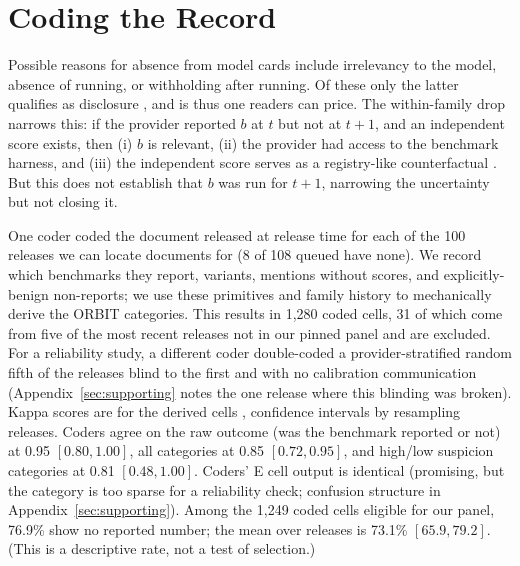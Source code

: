 \documentclass{article}
\begin{document}
\section{Coding the Record}\label{sec:reach}

Possible reasons for absence from model cards include irrelevancy to the model, absence of running, or withholding after running. Of these only the latter qualifies as disclosure \citep{grossman1981,milgrom1981,dye1985}, and is thus one readers can price. The within-family drop narrows this: if the provider reported $b$ at $t$ but not at $t + 1$, and an independent score exists, then (i) $b$ is relevant, (ii) the provider had access to the benchmark harness, and (iii) the independent score serves as a registry-like counterfactual \citep{chan2004,dwan2013,kirkham2010}. But this does not establish that $b$ was run for $t + 1$, narrowing the \citet{dye1985} uncertainty but not closing it.

One coder coded the document released at release time for each of the 100 releases we can locate documents for (8 of 108 queued have none). We record which benchmarks they report, variants, mentions without scores, and explicitly-benign non-reports; we use these primitives and family history to mechanically derive the ORBIT categories. This results in 1,280 coded cells, 31 of which come from five of the most recent releases not in our pinned panel and are excluded. For a reliability study, a different coder double-coded a provider-stratified random fifth of the releases blind to the first and with no calibration communication (Appendix~\ref{sec:supporting} notes the one release where this blinding was broken). Kappa scores are for the derived cells \citep{cohen1960}, confidence intervals by resampling releases. Coders agree on the raw outcome (was the benchmark reported or not) at 0.95 $[0.80, 1.00]$, all categories at 0.85 $[0.72, 0.95]$, and high/low suspicion categories at 0.81 $[0.48, 1.00]$. Coders' E cell output is identical (promising, but the category is too sparse for a reliability check; confusion structure in Appendix~\ref{sec:supporting}). Among the 1,249 coded cells eligible for our panel, 76.9\% show no reported number; the mean over releases is 73.1\% $[65.9, 79.2]$. (This is a descriptive rate, not a test of selection.)
\end{document}
